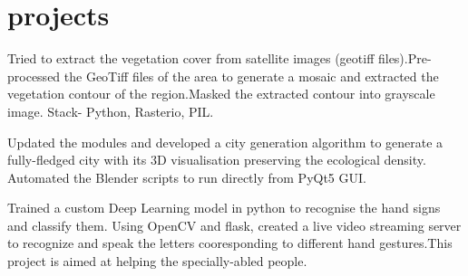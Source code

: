 \documentclass[a4paper]{deedy-resume} %
\begin{document}
\begin{minipage}[t]{0.66\textwidth}




\section{projects}

Tried to extract the vegetation cover from satellite images (geotiff files).Pre-processed the GeoTiff files of the area to generate a mosaic and extracted the vegetation contour of the region.Masked the extracted contour into grayscale image. Stack- Python, Rasterio, PIL.

\sectionspace %


Updated the modules and developed a city generation algorithm to generate a fully-fledged city with its 3D visualisation preserving the ecological density. Automated the Blender scripts to run directly from PyQt5 GUI.
\sectionspace %


Trained a custom Deep Learning model in python to recognise the hand signs and classify them. Using OpenCV and flask, created a live video streaming server to recognize and speak the letters cooresponding to different hand gestures.This project is aimed at helping the specially-abled people.
\sectionspace %


\end{minipage}
\end{document}
